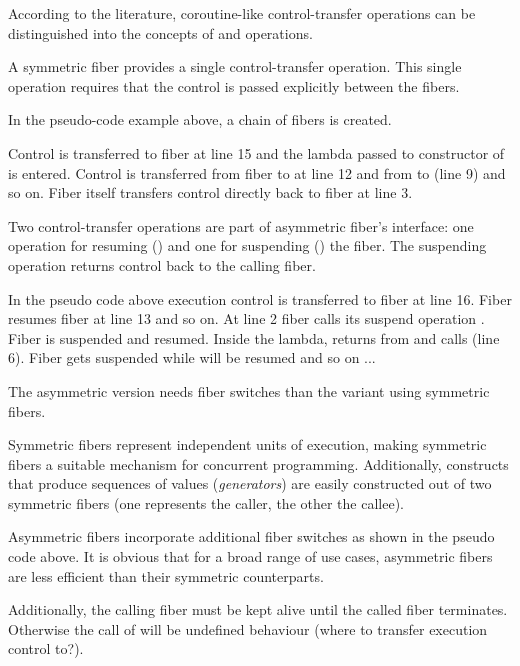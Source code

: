 
According to the literature\cite{Moura2009}, coroutine-like control-transfer
operations can be distinguished into the concepts of \sym and \asym
operations.

 A symmetric fiber provides a single
control-transfer operation. This single operation requires that the control is
passed explicitly between the fibers.


\seeappaassert

In the pseudo-code example above, a chain of fibers is created.

Control is transferred to fiber  at line 15 and the lambda
passed to constructor of  is entered. Control is transferred from
fiber  to  at line 12 and from  to  (line 9) and
so on. Fiber  itself transfers control directly back to
fiber  at line 3.

 Two control-transfer operations are part of
asymmetric fiber's interface: one operation for resuming (\resume) and one for
suspending () the fiber. The suspending operation returns
control back to the calling fiber.

In the pseudo code above execution control is transferred to fiber  at
line 16. Fiber  resumes fiber  at line 13 and so on. At line 2
fiber  calls its suspend operation . Fiber 
is suspended and  resumed. Inside the lambda,  returns from
 and calls  (line 6). Fiber  gets
suspended while  will be resumed and so on ...

The asymmetric version needs  fiber switches than the variant
using symmetric fibers.


Symmetric fibers represent independent units of execution, making symmetric
fibers a suitable mechanism for concurrent programming. Additionally,
constructs that produce sequences of values (\emph{generators}) are easily
constructed out of two symmetric fibers (one represents the caller, the other
the callee).

Asymmetric fibers incorporate additional fiber switches as shown in the pseudo
code above. It is obvious that for a broad range of use cases, asymmetric
fibers are less efficient than their symmetric counterparts.

Additionally, the calling fiber must be kept alive until the called fiber
terminates. Otherwise the call of  will be undefined behaviour
(where to transfer execution control to?).

